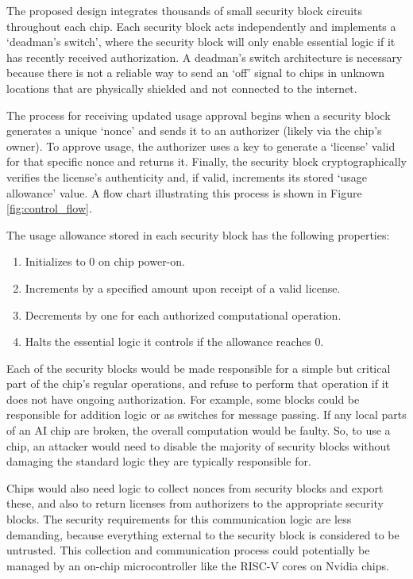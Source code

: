 \documentclass{article}
\begin{document}
The proposed design integrates thousands of small security block circuits throughout each chip. Each security block acts independently and implements a `deadman's switch', where the security block will only enable essential logic if it has recently received authorization. A deadman's switch architecture is necessary because there is not a reliable way to send an `off' signal to chips in unknown locations that are physically shielded and not connected to the internet.

The process for receiving updated usage approval begins when a security block generates a unique `nonce' and sends it to an authorizer (likely via the chip's owner). To approve usage, the authorizer uses a key to generate a `license' valid for that specific nonce and returns it. Finally, the security block cryptographically verifies the license's authenticity and, if valid, increments its stored `usage allowance' value. A flow chart illustrating this process is shown in Figure \ref{fig:control_flow}.

The usage allowance stored in each security block has the following properties:
\begin{enumerate}
    \item Initializes to 0 on chip power-on.
    \item Increments by a specified amount upon receipt of a valid license.
    \item Decrements by one for each authorized computational operation.
    \item Halts the essential logic it controls if the allowance reaches 0.
\end{enumerate}

Each of the security blocks would be made responsible for a simple but critical part of the chip's regular operations, and refuse to perform that operation if it does not have ongoing authorization. For example, some blocks could be responsible for addition logic or as switches for message passing. If any local parts of an AI chip are broken, the overall computation would be faulty. So, to use a chip, an attacker would need to disable the majority of security blocks without damaging the standard logic they are typically responsible for.

Chips would also need logic to collect nonces from security blocks and export these, and also to return licenses from authorizers to the appropriate security blocks. The security requirements for this communication logic are less demanding, because everything external to the security block is considered to be untrusted. This collection and communication process could potentially be managed by an on-chip microcontroller like the RISC-V cores on Nvidia chips.
\end{document}
